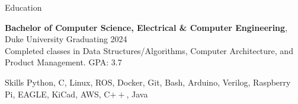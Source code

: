 \documentclass{resume}
\begin{document}






\begin{rSection}{Education}

\textbf{Bachelor of Computer Science, Electrical \& Computer Engineering}, Duke University \hfill {Graduating 2024}\\
Completed classes in Data Structures/Algorithms, Computer Architecture, and Product Management. \hfill {GPA: 3.7}


\end{rSection}

\begin{rSection}{Skills}
    Python, C, Linux, ROS, Docker, Git, Bash, Arduino, Verilog, Raspberry Pi, EAGLE, KiCad, AWS, C$++$, Java 
\end{rSection}

\end{document}
